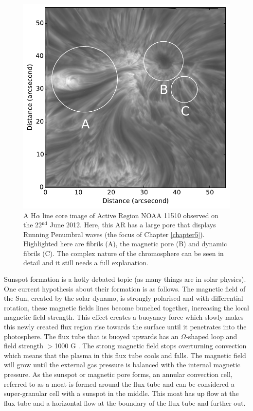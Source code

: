     \begin{figure}
    	\centering
    	\includegraphics[width=\textwidth]{Chromo.pdf}
    	\caption{
    		A H$\alpha$ line core image of Active Region NOAA 11510 observed on the 22$^{\mathrm{nd}}$ June 2012.
    		Here, this AR has a large pore that displays Running Penumbral waves (the focus of Chapter \ref{chapter5}).
    		Highlighted here are fibrils (A), the magnetic pore (B) and dynamic fibrils (C).
    		The complex nature of the chromosphere can be seen in detail and it still needs a full explanation.
    	}
    	\label{fig:chromosphere}
    \end{figure}   
    	
    Sunspot formation is a hotly debated topic (as many things are in solar physics).
    One current hypothesis about their formation is as follows.
    The magnetic field of the Sun, created by the solar dynamo, is strongly polarised and with differential rotation, these magnetic fields lines become bunched together, increasing the local magnetic field strength.
    This effect creates a buoyancy force which slowly makes this newly created flux region rise towards the surface until it penetrates into the photosphere.
    The flux tube that is buoyed upwards has an $\Omega$-shaped loop and field strength $>$1000 G \citep{stix2004sun,2014SoPh..289.3351T}.
    The strong magnetic field stops overturning convection which means that the plasma in this flux tube cools and falls. 
    The magnetic field will grow until the external gas pressure is balanced with the internal magnetic pressure.
    As the sunspot or magnetic pore forms, an annular convection cell, referred to as a moat is formed around the flux tube and can be considered a super-granular cell with a sunspot in the middle.
    This moat has up flow at the flux tube and a horizontal flow at the boundary of the flux tube and further out.

